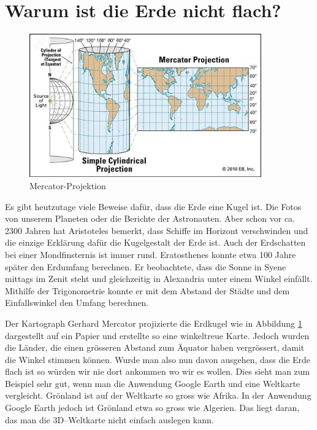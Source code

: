 

\section{Warum ist die Erde nicht flach?}
\begin{figure}
	\begin{center}
		\includegraphics[width=10cm]{papers/nav/bilder/projektion.png}
		\caption[Mercator-Projektion]{Mercator-Projektion}
		\label{merc}
	\end{center}	
\end{figure}
Es gibt heutzutage viele Beweise dafür, dass die Erde eine Kugel ist. 
Die Fotos von unserem	Planeten oder die Berichte der Astronauten. 
%
Aber schon vor ca. 2300 Jahren hat Aristoteles bemerkt, dass Schiffe im Horizont verschwinden und die einzige Erklärung dafür die Kugelgestalt der Erde ist.
%
Auch der Erdschatten bei einer Mondfinsternis ist immer rund.
%
Eratosthenes konnte etwa 100 Jahre später den Erdumfang berechnen. 
%
Er beobachtete, dass die Sonne in Syene mittags im Zenit steht und gleichzeitig in Alexandria unter einem Winkel einfällt. 
%
%
Mithilfe der Trigonometrie konnte er mit dem Abstand der Städte und dem
Einfallswinkel den Umfang berechnen.

Der Kartograph Gerhard Mercator projizierte die Erdkugel wie in Abbildung
\ref{merc} dargestellt auf ein Papier und erstellte so eine winkeltreue Karte. 
%
%
%
Jedoch wurden die Länder, die einen grösseren Abstand zum Äquator haben vergrössert, damit die Winkel stimmen können. 
Wurde man also nun davon ausgehen, dass die Erde flach ist so würden wir nie dort ankommen wo wir es wollen.
Dies sieht man zum Beispiel sehr gut, wenn man die Anwendung Google Earth und eine Weltkarte vergleicht. 
Grönland ist auf der Weltkarte so gross wie Afrika. 
%
%
In der Anwendung Google Earth jedoch ist Grönland etwa so gross wie Algerien. 
%
Das liegt daran, das man die 3D–Weltkarte nicht einfach auslegen kann. 

